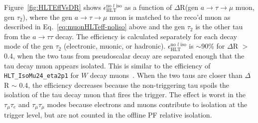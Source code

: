 Figure~\ref{fig:HLTEffVsDR} shows $\epsilon_{\text{HLT}}^{\text{no }l\text{ iso}}$ as a function of $\Delta$R(gen $a\rightarrow\tau\rightarrow\mu$ muon, gen $\tau_{\text{2}}$), where the gen $a\rightarrow\tau\rightarrow\mu$ muon is matched to the reco'd muon as described in Eq.~\ref{eq:muonHLTeff-noliso} above and the gen $\tau_{\text{2}}$ is the other tau from the $a\rightarrow\tau\tau$ decay.  The efficiency is calculated separately for each decay mode of the gen $\tau_{\text{2}}$ (electronic, muonic, or hadronic).  $\epsilon_{\text{HLT}}^{\text{no }l\text{ iso}}$ is $\sim$90\% for $\Delta$R $>$ 0.4, when the two taus from pseudoscalar decay are separated enough that the tau decay muon appears isolated. This is similar to the efficiency of \texttt{HLT\_IsoMu24\_eta2p1} for $W$ decay muons~\cite{1748-0221-7-10-P10002}.  When the two taus are closer than $\Delta$R $\sim$ 0.4, the efficiency decreases because the non-triggering tau spoils the isolation of the tau decay muon that fires the trigger.  The effect is worst in the $\tau_{\mu}\tau_{e}$ and $\tau_{\mu}\tau_{\mu}$ modes because electrons and muons contribute to isolation at the trigger level, but are not counted in the offline PF relative isolation.

